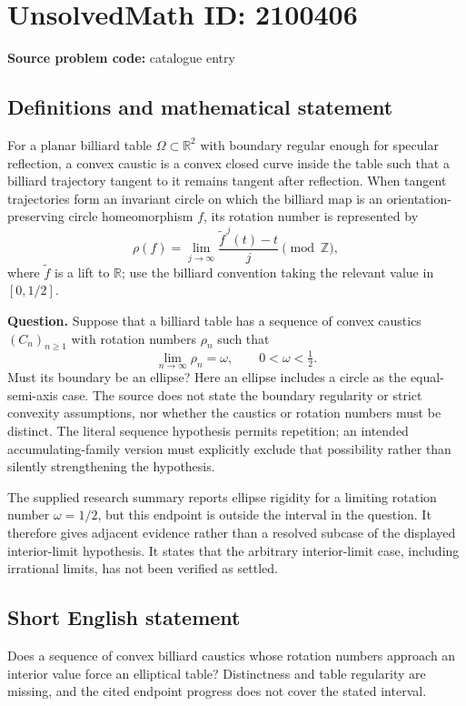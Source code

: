 \documentclass[11pt]{article}
\begin{document}
\section*{UnsolvedMath ID: 2100406}
\textbf{Source problem code:} catalogue entry
\subsection{Definitions and mathematical statement}
For a planar billiard table $\Omega\subset\mathbb R^2$ with boundary regular enough for specular reflection, a convex caustic is a convex closed curve inside the table such that a billiard trajectory tangent to it remains tangent after reflection. When tangent trajectories form an invariant circle on which the billiard map is an orientation-preserving circle homeomorphism $f$, its rotation number is represented by
\[
\rho(f)=\lim_{j\to\infty}\frac{\widetilde f^{\,j}(t)-t}{j}\pmod{\mathbb Z},
\]
where $\widetilde f$ is a lift to $\mathbb R$; use the billiard convention taking the relevant value in $[0,1/2]$.

\textbf{Question.} Suppose that a billiard table has a sequence of convex caustics $(C_n)_{n\geq1}$ with rotation numbers $\rho_n$ such that
\[
\lim_{n\to\infty}\rho_n=\omega,\qquad 0<\omega<\tfrac12.
\]
Must its boundary be an ellipse? Here an ellipse includes a circle as the equal-semi-axis case. The source does not state the boundary regularity or strict convexity assumptions, nor whether the caustics or rotation numbers must be distinct. The literal sequence hypothesis permits repetition; an intended accumulating-family version must explicitly exclude that possibility rather than silently strengthening the hypothesis.

The supplied research summary reports ellipse rigidity for a limiting rotation number $\omega=1/2$, but this endpoint is outside the interval in the question. It therefore gives adjacent evidence rather than a resolved subcase of the displayed interior-limit hypothesis. It states that the arbitrary interior-limit case, including irrational limits, has not been verified as settled.
\subsection{Short English statement}
Does a sequence of convex billiard caustics whose rotation numbers approach an interior value force an elliptical table? Distinctness and table regularity are missing, and the cited endpoint progress does not cover the stated interval.
\end{document}
